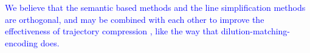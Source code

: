 \textcolor{blue}{We believe that the semantic based methods and the line simplification methods are orthogonal, and may be combined with each other to improve the effectiveness of trajectory compression \cite{Lin:Cised}, like the way that dilution-matching-encoding \cite{Gotsman:Compaction} does.}



